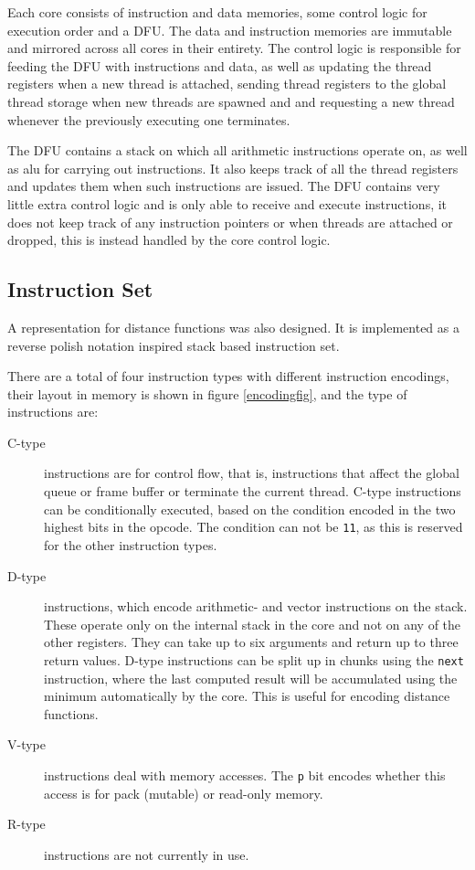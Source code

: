 			Each core consists of instruction and data memories, some control 
			logic for execution order and a DFU. The data and instruction 
			memories are immutable and mirrored across all cores in their 
			entirety. The control logic is responsible for feeding the DFU with
			instructions and data, as well as updating the thread registers 
			when a new thread is attached, sending thread registers to the 
			global thread storage when new threads are spawned and and 
			requesting a new thread whenever the previously executing one 
			terminates.
			
			The DFU contains a stack on which all arithmetic instructions 
			operate on, as well as alu for carrying out instructions. It also 
			keeps track of all the thread registers and updates them when such
			instructions are issued. The DFU contains very little extra control
			logic and is only able to receive and execute instructions, it does
			not keep track of any instruction pointers or when threads are 
			attached or dropped, this is instead handled by the core control
			logic.

		\subsection{Instruction Set}

			A representation for distance functions was also designed. It is
			implemented as a reverse polish notation inspired stack based 
			instruction set.

			There are a total of four instruction types with different
			instruction encodings, their layout in memory is shown in figure
			\ref{encodingfig}, and the type of instructions are:

			\begin{description}
				\item[C-type] instructions are for control flow, that is, 
					instructions that affect the global queue or frame buffer or
					terminate the current thread. C-type instructions can be 
					conditionally executed, based on the condition encoded in
					the two highest bits in the opcode. The condition can not
					be \texttt{11}, as this is reserved for the other 
					instruction types.

				\item[D-type] instructions, which encode arithmetic- and vector
					instructions on the stack. These operate only on the
					internal stack in the core and not on any of the other
					registers. They can take up to six arguments and return up
					to three return values. D-type instructions can be split up
					in chunks using the \texttt{next} instruction, where the
					last computed result will be accumulated using the minimum
					automatically by the core.  This is useful for encoding
					distance functions.

				\item[V-type] instructions deal with memory accesses. The
					\texttt{p} bit encodes whether this access is for pack
					(mutable) or read-only memory.

				\item[R-type] instructions are not currently in use.
			\end{description}

